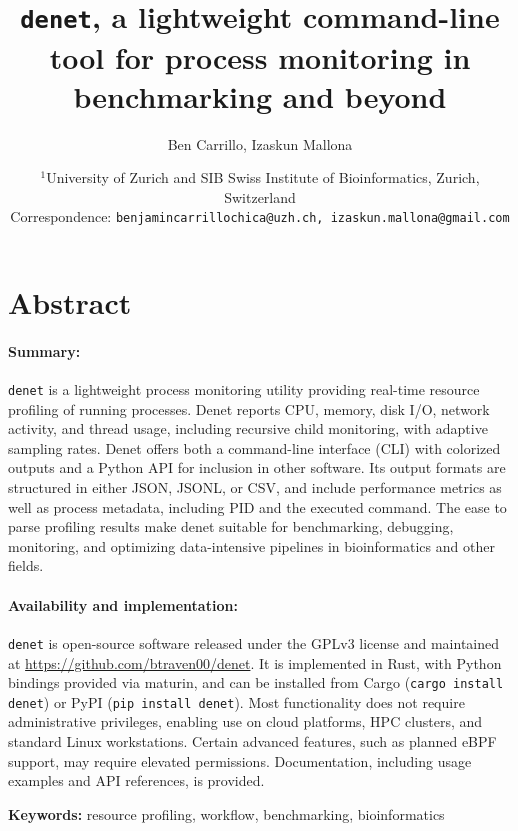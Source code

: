 \documentclass[10pt]{article}
\title{\texttt{denet}, a lightweight command-line tool for process monitoring in benchmarking and beyond}
\author{Ben Carrillo, Izaskun Mallona}
\date{
	$^1$University of Zurich and SIB Swiss Institute of Bioinformatics, Zurich, Switzerland \\ Correspondence: \texttt{benjamincarrillochica@uzh.ch, izaskun.mallona@gmail.com}\\%
}
\begin{document}
\maketitle
	
\section*{Abstract} %

\paragraph{Summary:} \texttt{denet} is a lightweight process monitoring utility providing real-time resource profiling of running processes. Denet reports CPU, memory, disk I/O, network activity, and thread usage, including recursive child monitoring, with adaptive sampling rates. Denet offers both a command-line interface (CLI) with colorized outputs and a Python API for inclusion in other software. Its output formats are structured in either JSON, JSONL, or CSV, and include performance metrics as well as process metadata, including PID and the executed command. The ease to parse profiling results make denet suitable for benchmarking, debugging, monitoring, and optimizing data-intensive pipelines in bioinformatics and other fields. 

\paragraph{Availability and implementation:} \texttt{denet} is open-source software released under the GPLv3 license and maintained at \url{https://github.com/btraven00/denet}. It is implemented in Rust, with Python bindings provided via maturin, and can be installed from Cargo (\texttt{cargo install denet}) or PyPI (\texttt{pip install denet}). Most functionality does not require administrative privileges, enabling use on cloud platforms, HPC clusters, and standard Linux workstations. Certain advanced features, such as planned eBPF support, may require elevated permissions. Documentation, including usage examples and API references, is provided.

\vspace{1cm}

\noindent\textbf{Keywords:} resource profiling, workflow, benchmarking, bioinformatics

\clearpage
\end{document}
